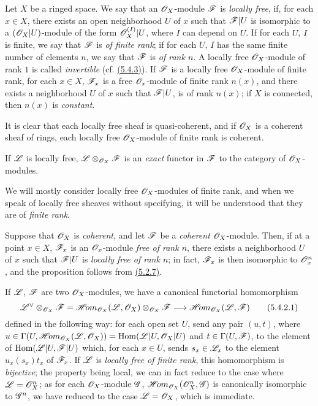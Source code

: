 \begin{env}[5.4.1]
\label{env-0.5.4.1}
Let $X$ be a ringed space. We say that an $\mathscr{O}_X$-module $\mathscr{F}$ is
{\em locally free}, if, for each $x\in X$, there exists an open neighborhood
$U$ of $x$ such that $\mathscr{F}|U$ is isomorphic to a $(\mathscr{O}_X|U)$-module of the
form $\mathscr{O}_X^{(I)}|U$, where $I$ can depend on $U$. If for each $U$, $I$ is
finite, we say that $\mathscr{F}$ is {\em of finite rank}; if for each $U$, $I$ has
the same finite number of elements $n$, we say that $\mathscr{F}$ is {\em of rank
$n$}. A locally free $\mathscr{O}_X$-module of rank $1$ is called {\em invertible}
(cf. \hyperref[env-0.5.4.3]{(5.4.3)}). If $\mathscr{F}$ is a locally free $\mathscr{O}_X$-module of finite
rank, for each $x\in X$, $\mathscr{F}_x$ is a free $\mathscr{O}_x$-module of finite rank
$n(x)$, and there exists a neighborhood $U$ of $x$ such that $\mathscr{F}|U$, is of
rank $n(x)$; if $X$ is connected, then $n(x)$ is {\em constant}.

It is clear that each locally free sheaf is quasi-coherent, and if $\mathscr{O}_X$ is a
coherent sheaf of rings, each locally free $\mathscr{O}_X$-module of finite rank is
coherent.

If $\mathscr{L}$ is locally free, $\mathscr{L}\otimes_{\mathscr{O}_X}\mathscr{F}$ is an {\em exact}
functor in $\mathscr{F}$ to the category of $\mathscr{O}_X$-modules.

We will mostly consider locally free $\mathscr{O}_X$-modules of finite rank,
and when we speak of locally free sheaves without specifying, it will be
understood that they are of {\em finite rank}.

Suppose that $\mathscr{O}_X$ is {\em coherent}, and let $\mathscr{F}$ be a {\em coherent}
$\mathscr{O}_X$-module. Then, if at a point $x\in X$, $\mathscr{F}_x$ is an $\mathscr{O}_x$-module
{\em free of rank $n$}, there exists a neighborhood $U$ of $x$ such that
$\mathscr{F}|U$ is {\em locally free of rank $n$}; in fact, $\mathscr{F}_x$ is then
isomorphic to $\mathscr{O}_x^n$, and the proposition follows from \hyperref[env-0.5.2.7]{(5.2.7)}.
\end{env}

\begin{env}[5.4.2]
\label{env-0.5.4.2}
If $\mathscr{L}$, $\mathscr{F}$ are two $\mathscr{O}_X$-modules, we have a canonical functorial
homomorphism
\[
  {\mathscr{L}}^\vee\otimes_{\mathscr{O}_X}\mathscr{F}
  =\mathscr{H}\!{om}_{\mathscr{O}_X}(\mathscr{L},\mathscr{O}_X)\otimes_{\mathscr{O}_X}\mathscr{F}
  \longrightarrow\mathscr{H}\!{om}_{\mathscr{O}_X}(\mathscr{L},\mathscr{F})
  \tag{5.4.2.1}
\]
defined in the following way: for each open set $U$, send any pair $(u,t)$,
where $u\in\Gamma(U,\mathscr{H}\!{om}_{\mathscr{O}_X}(\mathscr{L},\mathscr{O}_X))={\mathop{\mathrm{Hom}}\nolimits}(\mathscr{L}|U,\mathscr{O}_X|U)$ and
$t\in\Gamma(U,\mathscr{F})$, to the element of ${\mathop{\mathrm{Hom}}\nolimits}(\mathscr{L}|U,\mathscr{F}|U)$ which, for
each $x\in U$, sends $s_x\in\mathscr{L}_x$ to the element $u_x(s_x)t_x$ of
$\mathscr{F}_x$. If $\mathscr{L}$ is {\em locally free of finite rank}, this homomorphism
is {\em bijective}; the property being local, we can in fact reduce to the case
where $\mathscr{L}=\mathscr{O}_X^n$; as for each $\mathscr{O}_X$-module $\mathscr{G}$,
$\mathscr{H}\!{om}_{\mathscr{O}_X}(\mathscr{O}_X^n,\mathscr{G})$ is canonically isomorphic to $\mathscr{G}^n$, we
have reduced to the case $\mathscr{L}=\mathscr{O}_X$, which is immediate.
\end{env}

